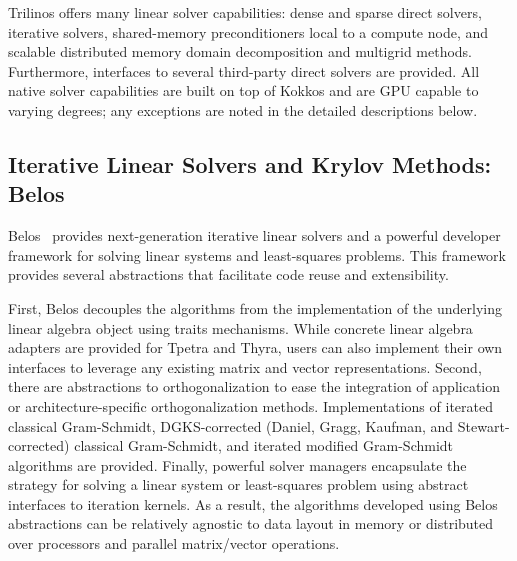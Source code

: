 
%

Trilinos offers many linear solver capabilities: dense and sparse direct solvers, iterative solvers, shared-memory preconditioners local to a compute node, and scalable distributed memory domain decomposition and multigrid methods. Furthermore, interfaces to several third-party direct solvers are provided. All native solver capabilities are built on top of Kokkos and are GPU capable to varying degrees; any exceptions are noted in the detailed descriptions below.




\subsection{Iterative Linear Solvers and Krylov Methods: Belos}

Belos~\cite{Bavier2012a} provides next-generation iterative linear solvers and a powerful developer framework for solving linear systems and least-squares problems. This framework provides several abstractions that facilitate code reuse and extensibility.

First, Belos decouples the algorithms from the implementation of the underlying linear algebra object using traits mechanisms.  While concrete linear algebra adapters are provided for Tpetra and Thyra, users can also implement their own interfaces to leverage any existing matrix and vector representations. Second, there are abstractions to orthogonalization to ease the integration of application or architecture-specific orthogonalization methods. Implementations of iterated classical Gram-Schmidt, DGKS-corrected (Daniel, Gragg, Kaufman, and Stewart-corrected) classical Gram-Schmidt, and iterated modified Gram-Schmidt algorithms are provided.  Finally, powerful solver managers encapsulate the strategy for solving a linear system or least-squares problem using abstract interfaces to iteration kernels.  As a result, the algorithms developed using Belos abstractions can be relatively agnostic to data layout in memory or distributed over processors and parallel matrix/vector operations.

